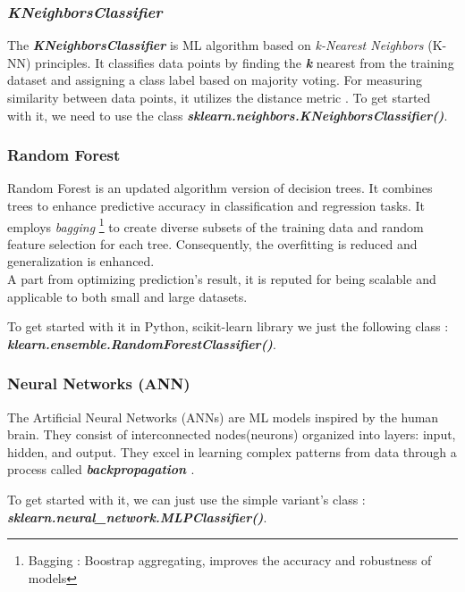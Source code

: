 \documentclass[12pt,a4paper, oneside]{book}
\begin{document}
\subsubsection{\textit{KNeighborsClassifier}}
The \textbf{\textit{KNeighborsClassifier}} is ML algorithm based on \textit{k-Nearest Neighbors} (K-NN) principles. It classifies data points by finding the \textbf{\textit{k}} nearest from the training dataset and assigning a class label based on majority voting. For measuring similarity between data points, it utilizes the distance metric \citep{nayak2022study}. 
To get started with it, we need to use the class\textbf{ \textit{sklearn.neighbors.KNeighborsClassifier()}}. 

\subsubsection{Random Forest}
Random Forest is an updated algorithm version of  decision trees. It combines trees to enhance predictive accuracy in classification and regression tasks. It employs \textit{bagging} \footnote{Bagging : Boostrap aggregating, improves the accuracy and robustness of models}  to create diverse subsets of the training data and random feature selection for each tree\citep{lin2017ensemble}. Consequently, the overfitting is reduced and generalization is enhanced. \\

A part from optimizing prediction's result, it is reputed for being scalable and applicable to both small and large datasets. 

To get started with it in Python, scikit-learn library we just the following class : \newline \textbf{\textit{klearn.ensemble.RandomForestClassifier()}}. 
\subsubsection{Neural Networks (ANN)}
The Artificial Neural Networks (ANNs) are ML models inspired by the human brain. They consist of interconnected nodes(neurons) \citep{boateng2020basic} organized into layers: input, hidden, and output. They excel in learning complex patterns from data through a process called \textbf{\textit{backpropagation} \citep{lillicrap2020backpropagation}}. 

To get started with it, we can just use the simple variant's class : \newline \textit{\textbf{sklearn.neural\_network.MLPClassifier()}}.
\end{document}
